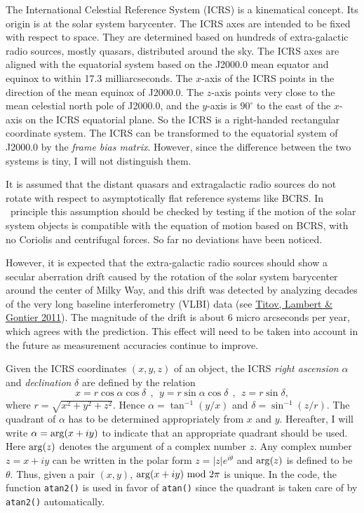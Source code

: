 \documentclass[12pt]{article}
\newcommand \beq {\begin{equation}}
\newcommand \eeq {\end{equation}}
\begin{document}
The International Celestial Reference System (ICRS) is a kinematical concept. Its 
origin is at the solar system barycenter. The ICRS axes are intended to be 
fixed with respect to space. They are 
determined based on hundreds of extra-galactic radio sources, mostly quasars, distributed 
around the sky. The ICRS axes are aligned with the equatorial system based on 
the J2000.0 mean equator and equinox to within 17.3 milliarcseconds. The $x$-axis 
of the ICRS points in the direction of the mean equinox of J2000.0. The $z$-axis 
points very close to the mean celestial north pole of J2000.0, and the $y$-axis 
is $90^\circ$ to the east of the $x$-axis on the ICRS equatorial plane. So the ICRS 
is a right-handed rectangular coordinate system. The ICRS can be transformed to the 
equatorial system of J2000.0 by the {\em frame bias matrix}. However, since the 
difference between the two systems is tiny, I will not distinguish them.

It is assumed that the distant quasars and extragalactic radio sources do not 
rotate with respect to asymptotically flat reference systems like BCRS. In \
principle this assumption should be checked by testing if the motion of 
the solar system objects is compatible with the equation of motion based 
on BCRS, with no Coriolis and centrifugal forces. So far no deviations have been 
noticed. 

However, it is expected that the extra-galactic radio sources
should show a secular aberration drift caused by the rotation of the solar
system barycenter around the center of Milky Way, and this drift was detected
by analyzing decades of the very long baseline interferometry (VLBI) data
(see \href{https://arxiv.org/abs/1009.3698}{Titov, Lambert \& Gontier 2011}).
The magnitude of the drift is about 6 micro arcseconds per year, which agrees
with the prediction. This effect will need to be taken into account in the
future as measurement accuracies continue to improve.

Given the ICRS coordinates $(x,y,z)$ of an object, the ICRS {\em right ascension} 
$\alpha$ and {\em declination} $\delta$ are defined by the relation 
\beq
  x = r \cos \alpha \cos \delta \ \ , \ \ 
  y = r \sin \alpha \cos \delta \ \ , \ \
  z = r \sin \delta ,
\eeq
where $r=\sqrt{x^2+y^2+z^2}$. Hence $\alpha = \tan^{-1} (y/x)$ and 
$\delta = \sin^{-1}(z/r)$. The quadrant of $\alpha$ has to be determined
appropriately from $x$ and $y$. Hereafter, I will write $\alpha = {\rm arg}(x+iy)$ 
to indicate that an appropriate quadrant should be used. Here ${\rm arg}(z)$ denotes 
the argument of a complex number $z$. Any complex number $z=x+iy$ can be written in 
the polar form $z=|z| e^{i\theta}$ and ${\rm arg}(z)$ is defined to be $\theta$. 
Thus, given a pair $(x,y)$, ${\rm arg}(x+iy)~{\rm mod}~2\pi$ is unique.
In the code, the function {\tt atan2()} is used in favor of {\tt atan()} 
since the quadrant is taken care of by {\tt atan2()} automatically.
\end{document}
